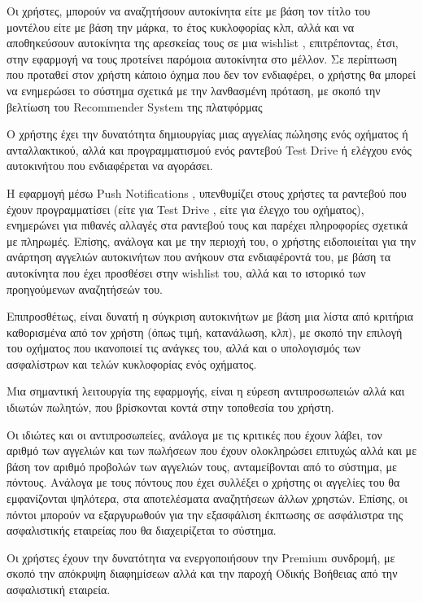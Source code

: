 \documentclass{../ol-softwaremanual}
\begin{document}
	Οι χρήστες, μπορούν να αναζητήσουν αυτοκίνητα είτε με βάση τον τίτλο του μοντέλου είτε με βάση την μάρκα, το έτος κυκλοφορίας κλπ, αλλά και να αποθηκεύσουν αυτοκίνητα της αρεσκείας τους σε μια \en wishlist \gr, επιτρέποντας, έτσι, στην εφαρμογή να τους προτείνει παρόμοια αυτοκίνητα στο μέλλον. Σε περίπτωση που προταθεί στον χρήστη κάποιο όχημα που δεν τον ενδιαφέρει, ο χρήστης θα μπορεί να ενημερώσει το σύστημα σχετικά με την λανθασμένη πρόταση, με σκοπό την βελτίωση του \en Recommender System \gr της πλατφόρμας \break 
	
	Ο χρήστης έχει την δυνατότητα δημιουργίας μιας αγγελίας πώλησης ενός οχήματος ή ανταλλακτικού, αλλά και προγραμματισμού ενός ραντεβού \en Test Drive \gr ή ελέγχου ενός αυτοκινήτου που ενδιαφέρεται να αγοράσει. \break
	
	Η εφαρμογή μέσω \en Push Notifications \gr, υπενθυμίζει στους χρήστες τα ραντεβού που έχουν προγραμματίσει (είτε για \en Test Drive \gr, είτε για έλεγχο του οχήματος), ενημερώνει για πιθανές αλλαγές στα ραντεβού τους και παρέχει πληροφορίες σχετικά με πληρωμές. Επίσης, ανάλογα και με την περιοχή του, ο χρήστης ειδοποιείται για την ανάρτηση αγγελιών αυτοκινήτων που ανήκουν στα ενδιαφέροντά του, με βάση τα αυτοκίνητα που έχει προσθέσει στην \en wishlist \gr του, αλλά και το ιστορικό των προηγούμενων αναζητήσεών του. \break
	
	Επιπροσθέτως, είναι δυνατή η σύγκριση αυτοκινήτων με βάση μια λίστα από κριτήρια καθορισμένα από τον χρήστη (όπως τιμή, κατανάλωση, κλπ), με σκοπό την επιλογή του οχήματος που ικανοποιεί τις ανάγκες του, αλλά και ο υπολογισμός των ασφαλίστρων και τελών κυκλοφορίας ενός οχήματος. \break
	
	Μια σημαντική λειτουργία της εφαρμογής, είναι η εύρεση αντιπροσωπειών αλλά και ιδιωτών πωλητών, που βρίσκονται κοντά στην τοποθεσία του χρήστη. \break
	
	Οι ιδιώτες και οι αντιπροσωπείες, ανάλογα με τις κριτικές που έχουν λάβει, τον αριθμό των αγγελιών και των πωλήσεων που έχουν ολοκληρώσει επιτυχώς αλλά και με βάση τον αριθμό προβολών των αγγελιών τους, ανταμείβονται από το σύστημα, με πόντους. Ανάλογα με τους πόντους που έχει συλλέξει ο χρήστης οι αγγελίες του θα εμφανίζονται ψηλότερα, στα αποτελέσματα αναζητήσεων άλλων χρηστών. Επίσης, οι πόντοι μπορούν να εξαργυρωθούν για την εξασφάλιση έκπτωσης σε ασφάλιστρα της ασφαλιστικής εταιρείας που θα διαχειρίζεται το σύστημα. \break
	
	Οι χρήστες έχουν την δυνατότητα να ενεργοποιήσουν την \en Premium \gr συνδρομή, με σκοπό την απόκρυψη διαφημίσεων αλλά και την παροχή Οδικής Βοήθειας από την ασφαλιστική εταιρεία. \break
	
\end{document}
